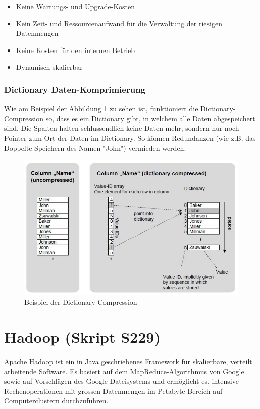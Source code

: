 \documentclass[a4paper, 11pt, nofootinbib]{article}
\begin{document}
\begin{itemize}
	\item Keine Wartungs- und Upgrade-Kosten
	\item Kein Zeit- und Ressourcenaufwand für die Verwaltung der riesigen Datenmengen
	\item Keine Kosten für den internen Betrieb
	\item Dynamisch skalierbar
\end{itemize}

\newpage

\subsubsection{Dictionary Daten-Komprimierung}

Wie am Beispiel der Abbildung \ref{fig:dictComp} zu sehen ist, funktioniert die Dictionary-Compression so, dass es ein Dictionary gibt, in welchem alle Daten abgespeichert sind. Die Spalten halten schlussendlich keine Daten mehr, sondern nur noch Pointer zum Ort der Daten im Dictionary. So können Redundanzen (wie z.B. das Doppelte Speichern des Namen "John") vermieden werden.
 
\begin{figure}[htb]
	\centering
	\includegraphics[keepaspectratio=true,height=15\baselineskip]{dictionary_compression.JPG}
	\caption{Beispiel der Dictionary Compression}
	\label{fig:dictComp}
\end{figure}

\newpage

\section{Hadoop (Skript S229)}
Apache Hadoop ist ein in Java geschriebenes Framework für skalierbare, verteilt arbeitende Software. Es basiert auf dem MapReduce-Algorithmus von Google sowie auf Vorschlägen des Google-Dateisystems und ermöglicht es, intensive Rechenoperationen mit grossen Datenmengen im Petabyte-Bereich auf Computerclustern durchzuführen.
\end{document}
